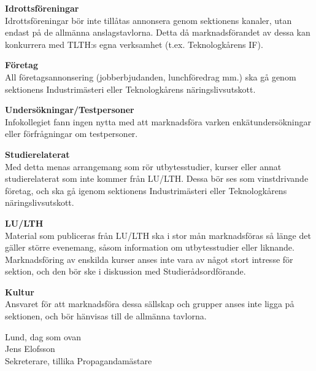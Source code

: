 \documentclass{dsekprotokoll}
\begin{document}
\textbf{Idrottsföreningar}\\
Idrottsföreningar bör inte tillåtas annonsera genom sektionens kanaler, utan endast på
de allmänna anslagstavlorna. Detta då marknadsförandet av dessa kan konkurrera med
TLTH:s egna verksamhet (t.ex. Teknologkårens IF).

\textbf{Företag}\\
All företagsannonsering (jobberbjudanden, lunchföredrag mm.) ska gå genom sektionens
Industrimästeri eller Teknologkårens näringslivsutskott.

\textbf{Undersökningar/Testpersoner}\\
Infokollegiet fann ingen nytta med att marknadsföra varken enkätundersökningar eller
förfrågningar om testpersoner.

\textbf{Studierelaterat}\\
Med detta menas arrangemang som rör utbytesstudier, kurser eller annat studierelaterat
som inte kommer från LU/LTH. Dessa bör ses som vinstdrivande företag, och ska gå
igenom sektionens Industrimästeri eller Teknologkårens näringslivsutskott.

\textbf{LU/LTH}\\
Material som publiceras från LU/LTH ska i stor mån marknadsföras så länge det gäller
större evenemang, såsom information om utbytesstudier eller liknande. Marknadsföring
av enskilda kurser anses inte vara av något stort intresse för sektion, och den bör ske i
diskussion med Studierådsordförande.

\textbf{Kultur}\\
Ansvaret för att marknadsföra dessa sällskap och grupper anses inte ligga på sektionen,
och bör hänvisas till de allmänna tavlorna.

\newpage

Lund, dag som ovan\\

Jens Elofsson \\
Sekreterare, tillika Propagandamästare
\end{document}
